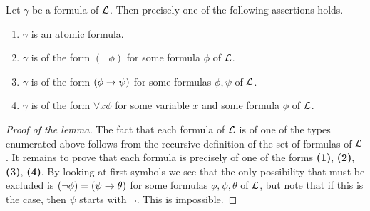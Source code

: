 \documentclass[10pt]{amsart}
\begin{document}
\begin{lemma}\label{lemma:presentation_of_formulas}
	Let $\gamma$ be a formula of ${\mathcal L}$. Then precisely one of the following assertions holds.
	\begin{enumerate}[label=\textbf{\emph{(\arabic*)}}, leftmargin=3.0em]
		\item $\gamma$ is an atomic formula.
		\item $\gamma$ is of the form $(\neg \phi)$ for some formula $\phi$ of ${\mathcal L}$.
		\item $\gamma$ is of the form $(\phi \rightarrow \psi)$ for some formulas $\phi, \psi$ of ${\mathcal L}$.
		\item $\gamma$ is of the form $\forall x \phi$ for some variable $x$ and some formula $\phi$ of ${\mathcal L}$.
	\end{enumerate}
\end{lemma}
\begin{proof}[Proof of the lemma]
	The fact that each formula of ${\mathcal L}$ is of one of the types enumerated above follows from the recursive definition of the set of formulas of ${\mathcal L}$. It remains to prove that each formula is precisely of one of the forms \textbf{(1)}, \textbf{(2)}, \textbf{(3)}, \textbf{(4)}. By looking at first symbols we see that the only possibility that must be excluded is $(\neg \phi) = (\psi \rightarrow \theta)$ for some formulas $\phi, \psi, \theta$ of ${\mathcal L}$, but note that if this is the case, then $\psi$ starts with $\neg$. This is impossible.
\end{proof}
\end{document}
